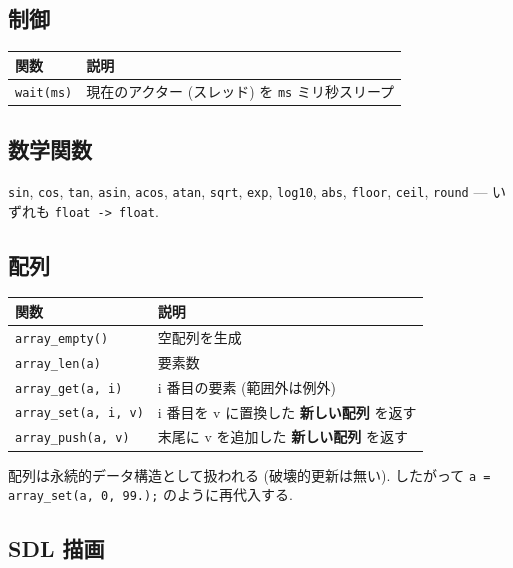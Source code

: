 \documentclass[11pt,a4paper]{article}
\begin{document}
\subsection{制御}

\begin{center}
\begin{tabular}{ll}
\toprule
関数 & 説明 \\
\midrule
\texttt{wait(ms)} & 現在のアクター (スレッド) を \texttt{ms} ミリ秒スリープ \\
\bottomrule
\end{tabular}
\end{center}

\subsection{数学関数}

\texttt{sin}, \texttt{cos}, \texttt{tan}, \texttt{asin}, \texttt{acos}, \texttt{atan},
\texttt{sqrt}, \texttt{exp}, \texttt{log10}, \texttt{abs}, \texttt{floor}, \texttt{ceil},
\texttt{round} --- いずれも \texttt{float -> float}.

\subsection{配列}

\begin{center}
\begin{tabular}{ll}
\toprule
関数 & 説明 \\
\midrule
\texttt{array\_empty()} & 空配列を生成 \\
\texttt{array\_len(a)} & 要素数 \\
\texttt{array\_get(a, i)} & i 番目の要素 (範囲外は例外) \\
\texttt{array\_set(a, i, v)} & i 番目を v に置換した \textbf{新しい配列} を返す \\
\texttt{array\_push(a, v)} & 末尾に v を追加した \textbf{新しい配列} を返す \\
\bottomrule
\end{tabular}
\end{center}

配列は永続的データ構造として扱われる (破壊的更新は無い). したがって
\texttt{a = array\_set(a, 0, 99.);} のように再代入する.

\subsection{SDL 描画}
\end{document}
